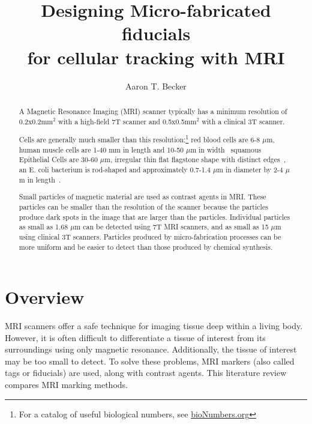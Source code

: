 \documentclass[letterpaper, 10 pt, conference]{ieeeconf}
\begin{document}
\author{Aaron T. Becker}
\title{Designing Micro-fabricated fiducials\\ for cellular tracking with MRI}
\maketitle

\begin{abstract}
A Magnetic Resonance Imaging (MRI) scanner typically has a minimum resolution of 0.2x0.2mm$^2$ with a high-field 7T scanner and 0.5x0.5mm$^2$ with a clinical 3T scanner\cite{olamaei2011accurate}.

Cells are generally much smaller than this resolution:\footnote{For a catalog of useful biological numbers, see \url{bioNumbers.org}}
red blood cells are 6-8 $\mu$m, 
human muscle cells are 1-40 mm in length and 10-50 $\mu$m in width~\cite{lodish2000muscle}
squamous Epithelial Cells are 30-60 $\mu$m, irregular thin flat flagstone shape with distinct edges~\cite{brunzel2004fundamentals}, %
an E. coli bacterium is rod-shaped and approximately 0.7-1.4 $\mu$m in diameter by 2-4 $\mu$m in length~\cite{zaritsky1978chromosome}.

Small particles of magnetic material are used as contrast agents in MRI. 
These particles can be smaller than the resolution of the scanner because the particles produce dark spots in the image that are larger than the particles.  Individual particles as small as 1.68 $\mu$m can be detected using 7T MRI scanners, and as small as 15 $\mu$m using clinical 3T scanners. Particles produced by micro-fabrication processes can be more uniform and be easier to detect than those produced by chemical synthesis.



\end{abstract}

\section{Overview}
MRI scanners offer a safe technique for imaging tissue deep within a living body.  However, it is often difficult to differentiate a tissue of interest from its surroundings using only magnetic resonance. Additionally, the tissue of interest may be too small to detect.  To solve these problems, MRI markers (also called tags or fiducials) are used, along with contrast agents.  This literature review compares MRI marking methods. 
\end{document}
